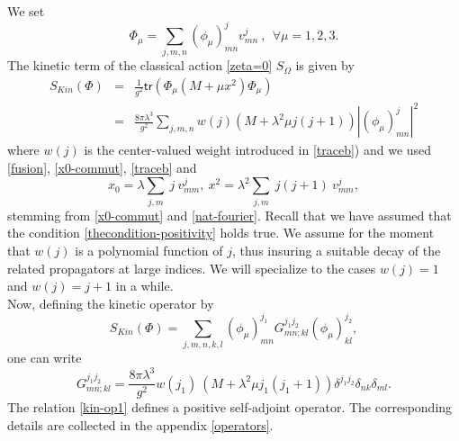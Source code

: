 \documentclass[11pt]{book}
\newcommand{\tr}{\mathsf{tr}}
\theoremstyle{break}
\begin{document}
We set%
%
\begin{equation}
\Phi_\mu = \sum_{j,m,n} (\phi_\mu)^j_{mn} v^j_{mn} \ , \ \ \forall \mu=1,2,3.
\end{equation}
%
The kinetic term of the classical action \eqref{zeta=0} $S_\Omega$ is given by%
%
\begin{eqnarray}
S_{Kin}(\Phi) &=& \frac{1}{g^2} \tr( \Phi_\mu (M+\mu x^2) \Phi_\mu)\label{skin} \\
&=& \frac{8\pi\lambda^3}{g^2} \sum_{j,m,n} w(j) (M+\lambda^2\mu j(j+1)) |(\phi_\mu)^j_{mn}|^2 \label{skin-explicit}
\end{eqnarray}
%
where $w(j)$ is the center-valued weight introduced in \eqref{traceb}) and we used \eqref{fusion}, \eqref{x0-commut}, \eqref{traceb} and 
\begin{equation}
x_0 = \lambda\sum_{j,m} \ j \ v^j_{mm},\ x^2 = \lambda^2\sum_{j,m} \ j(j+1) \ v^j_{mm},\label{relation-apendix1}
\end{equation}
stemming from \eqref{x0-commut} and \eqref{nat-fourier}. Recall that we have assumed that the condition \eqref{thecondition-positivity} holds true. We assume for the moment that $w(j)$ is a polynomial function of $j$, thus insuring a suitable decay of the related propagators at large indices. We will specialize to the cases $w(j)=1$ and $w(j)=j+1$ in a while.\\
Now, defining the kinetic operator by
\begin{equation*}
S_{Kin}(\Phi)=\sum_{j,m,n,k,l}(\phi_\mu)^{j_1}_{mn}G^{j_1j_2}_{mn;kl}(\phi_\mu)^{j_2}_{kl},
\end{equation*}
one can write 
%
\begin{equation}
G^{j_1j_2}_{mn;kl} = \frac{8\pi\lambda^3}{g^2} w(j_1) \ \left(M+\lambda^2\mu j_1(j_1+1)\right) \delta^{j_1j_2} \delta_{nk} \delta_{ml}.\label{kin-op1}
\end{equation}
The relation \eqref{kin-op1} defines a positive self-adjoint operator. The corresponding details are collected in the appendix \ref{operators}.\par 
\end{document}

